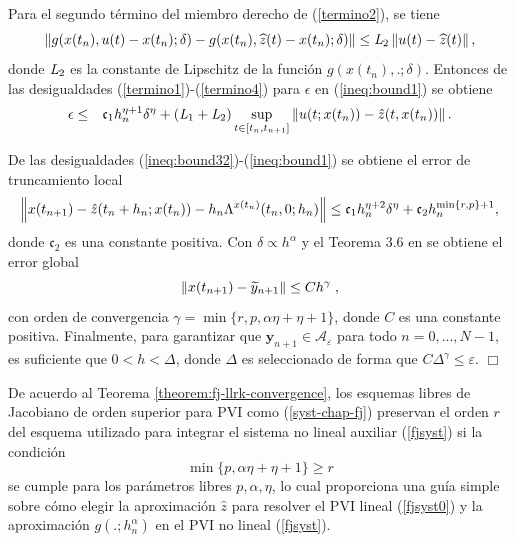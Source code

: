 Para el segundo término del miembro derecho de (\ref{termino2}), se tiene
\begin{equation}
    \left\lVert g(x(t_n),u(t)-x(t_n);\delta)-g(x(t_n),\widehat{z}(t)-x(t_n);\delta) \right\rVert \leq  \emph{L}_2\left\lVert u(t)-\widehat{z}(t) \right\rVert,
    \label{termino4}
\end{equation}
donde $\emph{L}_2$ es la constante de Lipschitz de la función $g(x(t_n),.;\delta)$. Entonces de las desigualdades (\ref{termino1})-(\ref{termino4}) para $\epsilon$ en (\ref{ineq:bound1}) se obtiene
\begin{eqnarray*}
	\epsilon & \leq & \mathfrak{c}_1 h_n^{\eta+1}\delta^{\eta} +  (\emph{L}_1+\emph{L}_2) \sup\limits_{t\in[t_n,t_{n+1}]} \left\lVert u(t;x(t_n))-\hat{z}(t,x(t_n)) \right\rVert.
\end{eqnarray*}

De las desigualdades (\ref{ineq:bound32})-(\ref{ineq:bound1}) se obtiene el error de truncamiento local
\begin{equation*}
    \left\lVert x(t_{n+1})-\hat{z}(t_n+h_n;x(t_n))-h_n\Lambda^{x(t_n)}(t_n,0;h_n) \right\rVert\leq \mathfrak{c}_1 h_n^{\eta+2}\delta^{\eta} + \mathfrak{c}_2 h_n^{\min\{r,p\}+1},
\end{equation*}
donde $\mathfrak{c}_2$ es una constante positiva. Con $\delta\propto h^{\alpha}$ y el Teorema 3.6 en \cite{hairer1993solving} se obtiene el error global
\begin{equation*}
    \left\lVert x(t_{n+1})-\widetilde{y}_{n+1} \right\rVert\leq Ch^\gamma \;,
\end{equation*}
con orden de convergencia  $\gamma = \min\{r,p,\alpha\eta+\eta+1\}$, donde $C$ es una constante positiva. Finalmente, para garantizar que
$\mathbf{y}_{n+1}\in \mathcal{A}_{\varepsilon }$
para todo $n=0,...,N-1$, es suficiente que  $0<h<\Delta $, donde  $\Delta$ es seleccionado de forma que  $C\Delta ^{\gamma
}\leq \varepsilon $. $\Box$

De acuerdo al Teorema \ref{theorem:fj-llrk-convergence}, los esquemas libres de Jacobiano de orden superior para PVI como (\ref{syst-chap-fj}) preservan el orden $r$ del esquema utilizado para integrar el sistema no lineal auxiliar (\ref{fjsyst}) si la condición
\begin{equation*}
    \min\{p,\alpha\eta+\eta+1\} \geq r
\end{equation*}
se cumple para los parámetros libres $p,\alpha,\eta$, lo cual proporciona una guía simple sobre cómo elegir la aproximación $\widehat{z}$ para resolver el PVI lineal (\ref{fjsyst0}) y la aproximación $g(.;h^{\alpha}_n)$ en el PVI no lineal (\ref{fjsyst}).


